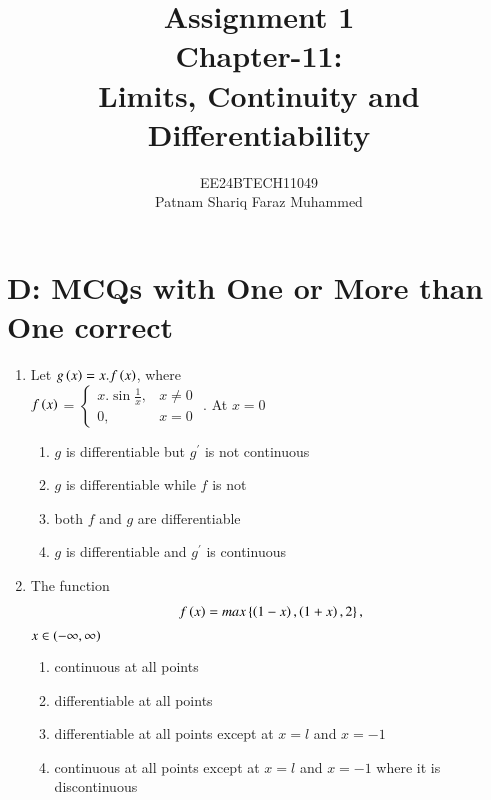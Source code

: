 \documentclass[journal,12pt]{IEEEtran}
\theoremstyle{remark}
\begin{document}


\title{Assignment 1 \\Chapter-11: \\Limits, Continuity and Differentiability}
\author{{EE24BTECH11049 \\ Patnam Shariq Faraz Muhammed}}


\maketitle
\newpage
\bigskip

\section*{D: MCQs with One or More than One correct}

\begin{enumerate}
    \item 
    Let $g\left(x\right)=x.f\left(x\right)$, where\\[6pt] $f\left(x\right)$ = $\begin{cases}
        x.\sin\frac{1}{x}, & x\neq 0\\
        0, & x=0
    \end{cases}$
    . At $x=0$
    
    \hfill 
    {}
    
    \begin{enumerate}
        
	    \item $g$ is differentiable but $g^{\prime}$ is not continuous
        \item $g$ is differentiable while $f$ is not
        \item both $f$ and $g$ are differentiable
	\item $g$ is differentiable and $g^{\prime}$ is continuous 
    \end{enumerate}

    \item 
	    The function \begin{align*}
		f\left(x\right) = max\left\{\left(1-x\right),\left(1+x\right),2\right\},
		\end{align*} 
		$x\in \left(-\infty,\infty\right)$  

    \hfill 
    {}
    
    \begin{enumerate}    
        \item continuous at all points
        \item differentiable at all points
        \item differentiable at all points except at $x=l$ and $x=-1$
        \item continuous at all points except at $x=l$ and $x=-1$ where it is discontinuous
    \end{enumerate}



\end{enumerate}
\end{document}
